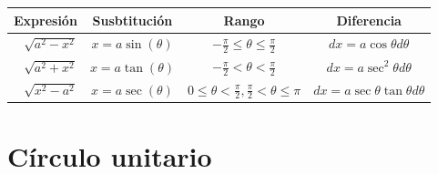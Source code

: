 \documentclass[twoside,landscape,letterpaper,twocolumn,13pt]{book}
\begin{document}
\begin{table}[t]
\begin{center}
\begin{tabular}{| r | c | c | c|}
\hline
Expresión & Susbtitución & Rango & Diferencia \\
\hline
$\sqrt{a^{2} - x^{2}}$ & $x = a \sin(\theta)$ & $-\frac{\pi}{2} \leq \theta \leq \frac{\pi}{2} $ & $dx = a \cos{\theta} d\theta$\\
 \hline
 $\sqrt{a^{2} + x^{2}}$ & $x = a \tan(\theta)$ & $-\frac{\pi}{2} < \theta < \frac{\pi}{2} $ & $dx = a \sec^{2}{\theta} d\theta$\\
 \hline
 $\sqrt{x^{2} -  a^{2}}$ & $x = a \sec(\theta)$ & $0 \leq \theta < \frac{\pi}{2}, \frac{\pi}{2} < \theta \leq \pi $ & $dx = a \sec{\theta}\tan{\theta} d\theta$\\
 \hline
\end{tabular}

\end{center}
\end{table}


\section*{Círculo unitario}
\end{document}
